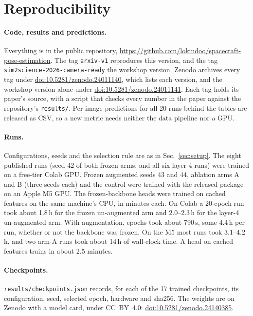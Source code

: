 



\clearpage
\section{Reproducibility}
\label{app:repro}

\paragraph{Code, results and predictions.} Everything is in the public repository,
\url{https://github.com/lokindoo/spacecraft-pose-estimation}. The tag \texttt{arxiv-v1}
reproduces this version, and the tag \texttt{sim2science-2026-camera-ready} the workshop
version. Zenodo archives every tag under
\href{https://doi.org/10.5281/zenodo.24011140}{doi:10.5281/zenodo.24011140}, which lists each
version, and the workshop version alone under
\href{https://doi.org/10.5281/zenodo.24011141}{doi:10.5281/zenodo.24011141}. Each tag holds its
paper's source, with a script that checks every number in the paper against the repository's
\texttt{results/}. Per-image predictions for all 20 runs
behind the tables are released as CSV, so a new metric needs neither the data pipeline nor a
GPU.

\paragraph{Runs.} Configurations, seeds and the selection rule are as in
Sec.~\ref{sec:setup}. The eight published runs (seed 42 of both frozen arms, and all six
layer-4 runs) were trained on a free-tier Colab GPU. Frozen augmented seeds 43 and 44,
ablation arms A and B (three seeds each) and the control were trained with the released
package on an Apple M5 GPU. The frozen-backbone heads were trained on cached features on the
same machine's CPU, in minutes each.
On Colab a 20-epoch run took about 1.8\,h for the frozen un-augmented arm and 2.0--2.3\,h for
the layer-4 un-augmented arm. With augmentation, epochs took about 790\,s, some 4.4\,h per
run, whether or not the backbone was frozen. On the M5 most runs took 3.1--4.2\,h, and two
arm-A runs took about 14\,h of wall-clock time. A head on cached features trains in about
2.5 minutes.

\paragraph{Checkpoints.} \texttt{results/checkpoints.json} records, for each of the 17 trained
checkpoints, its configuration, seed, selected epoch, hardware and sha256. The weights are on
Zenodo with a model card, under CC~BY~4.0:
\href{https://doi.org/10.5281/zenodo.24140385}{doi:10.5281/zenodo.24140385}.


